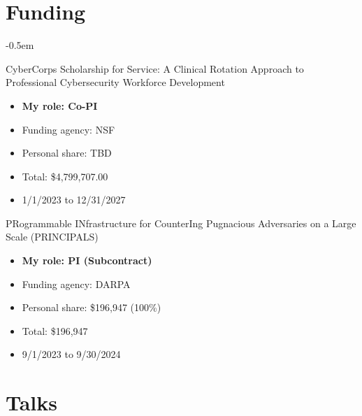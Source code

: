 \documentclass[10pt,singlecolumn]{article} %
\begin{document}

\section{Funding}

\begin{etaremune}
\itemsep -0.5em 

\item CyberCorps Scholarship for Service: A Clinical Rotation Approach to Professional Cybersecurity Workforce Development
    \begin{itemize}[noitemsep,topsep=0pt]
        \item \textbf{My role: Co-PI}
        \item Funding agency: NSF
        \item Personal share: TBD 
        \item Total: \$4,799,707.00
        \item 1/1/2023 to 12/31/2027
    \end{itemize}
\vspace{6pt}

\item PRogrammable INfrastructure for CounterIng Pugnacious Adversaries on a Large Scale (PRINCIPALS) 
    \begin{itemize}[noitemsep,topsep=0pt]
        \item \textbf{My role: PI (Subcontract)}
        \item Funding agency: DARPA
        \item Personal share: \$196,947 (100\%) 
        \item Total: \$196,947
        \item 9/1/2023 to 9/30/2024
    \end{itemize}
\vspace{6pt}

\end{etaremune}


\newpage 


\section{Talks} 
\end{document}

